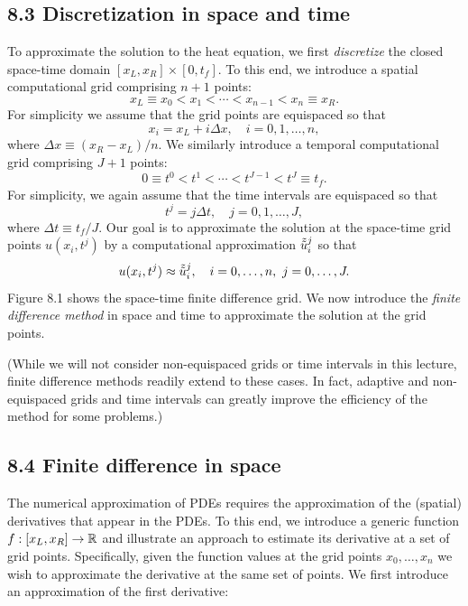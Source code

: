 \subsection{8.3 Discretization in space and time}
To approximate the solution to the heat equation, we first \textit{discretize} the closed space-time domain $[x_L, x_R] \times [0, t_f]$. To this end, we introduce a spatial computational grid comprising $n + 1$ points:
\[x_L \equiv x_0 < x_1 < \cdots < x_{n-1} < x_n \equiv x_R.\]
For simplicity we assume that the grid points are equispaced so that
\[x_i = x_L + i\Delta x, \quad i = 0, 1, \dots, n,\]
where $\Delta x \equiv (x_R - x_L)/n$. We similarly introduce a temporal computational grid comprising $J + 1$ points:
\[0 \equiv t^0 < t^1 < \cdots < t^{J-1} < t^J \equiv t_f.\]
For simplicity, we again assume that the time intervals are equispaced so that
\[t^j = j\Delta t, \quad j = 0, 1, \dots, J,\]
where $\Delta t \equiv t_f / J$. Our goal is to approximate the solution at the space-time grid points $u(x_i, t^j)$ by a computational approximation $\tilde{\tilde{u}}_i^j$ so that
\[u(x_i, t^j) \approx \tilde{\tilde{u}}_i^j, \quad i = 0, \dots, n, \ j = 0, \dots, J.\]
Figure 8.1 shows the space-time finite difference grid. We now introduce the \textit{finite difference method} in space and time to approximate the solution at the grid points.

(While we will not consider non-equispaced grids or time intervals in this lecture, finite difference methods readily extend to these cases. In fact, adaptive and non-equispaced grids and time intervals can greatly improve the efficiency of the method for some problems.)


\subsection{8.4 Finite difference in space}
The numerical approximation of PDEs requires the approximation of the (spatial) derivatives that appear in the PDEs. To this end, we introduce a generic function $f : [x_L, x_R] \to \mathbb{R}$ and illustrate an approach to estimate its derivative at a set of grid points. Specifically, given the function values at the grid points $x_0, \dots, x_n$ we wish to approximate the derivative at the same set of points. We first introduce an approximation of the first derivative:

